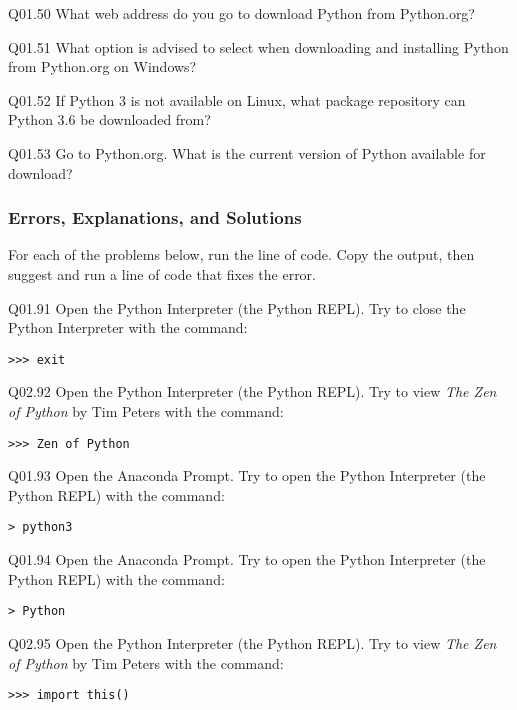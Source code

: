 \documentclass{book}
\newenvironment{problems}{}{}  %
\begin{document}
    
        \begin{problems}
        Q01.50 What web address do you go to download Python from Python.org?

Q01.51 What option is advised to select when downloading and installing
Python from Python.org on Windows?

Q01.52 If Python 3 is not available on Linux, what package repository
can Python 3.6 be downloaded from?

Q01.53 Go to Python.org. What is the current version of Python available
for download?
        \end{problems}

    




    
        \hypertarget{errors-explanations-and-solutions}{%
\subsubsection{Errors, Explanations, and
Solutions}\label{errors-explanations-and-solutions}}
    




    
        \begin{problems}
        For each of the problems below, run the line of code. Copy the output,
then suggest and run a line of code that fixes the error.

Q01.91 Open the Python Interpreter (the Python REPL). Try to close the
Python Interpreter with the command:

\begin{lstlisting}
>>> exit
\end{lstlisting}

Q02.92 Open the Python Interpreter (the Python REPL). Try to view
\emph{The Zen of Python} by Tim Peters with the command:

\begin{lstlisting}
>>> Zen of Python
\end{lstlisting}

Q01.93 Open the Anaconda Prompt. Try to open the Python Interpreter (the
Python REPL) with the command:

\begin{lstlisting}
> python3
\end{lstlisting}

Q01.94 Open the Anaconda Prompt. Try to open the Python Interpreter (the
Python REPL) with the command:

\begin{lstlisting}
> Python
\end{lstlisting}

Q02.95 Open the Python Interpreter (the Python REPL). Try to view
\emph{The Zen of Python} by Tim Peters with the command:

\begin{lstlisting}
>>> import this()
\end{lstlisting}
        \end{problems}
\end{document}
